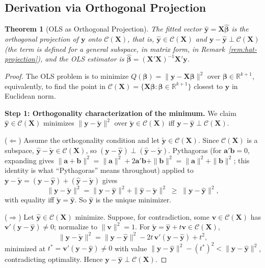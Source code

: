 \documentclass[14pt]{extarticle}
\theoremstyle{plain}
\newtheorem{theorem}{Theorem}[section]
\theoremstyle{definition}
\theoremstyle{remark}
\newcommand{\bX}{\mathbf{X}}
\newcommand{\by}{\mathbf{y}}
\def\bb{\boldsymbol{\beta}}
\newcommand{\bv}{\mathbf{v}}
\newcommand{\Real}{\mathbb{R}}
\newcommand{\calC}{\mathcal{C}}
\begin{document}
\subsection{Derivation via Orthogonal Projection}

\begin{theorem}[OLS as Orthogonal Projection]\label{thm:ols-proj}
The fitted vector $\hat{\by} = \bX\hat{\bb}$ is the orthogonal projection of $\by$ onto $\calC(\bX)$, that is, $\hat{\by} \in \calC(\bX)$ and $\by - \hat{\by} \perp \calC(\bX)$ (the term is defined for a general subspace, in matrix form, in Remark~\ref{rem:hat-projection}), and the OLS estimator is $\hat{\bb} = (\bX'\bX)^{-1}\bX'\by$.
\end{theorem}

\begin{proof}
The OLS problem is to minimize $Q(\bb) = \|\by - \bX\bb\|^2$ over $\bb \in \Real^{k+1}$, equivalently, to find the point in $\calC(\bX) = \{\bX\bb : \bb \in \Real^{k+1}\}$ closest to $\by$ in Euclidean norm.

\textbf{Step 1: Orthogonality characterization of the minimum.} We claim $\hat{\by} \in \calC(\bX)$ minimizes $\|\by - \tilde{\by}\|^2$ over $\tilde{\by} \in \calC(\bX)$ iff $\by - \hat{\by} \perp \calC(\bX)$.

($\Leftarrow$) Assume the orthogonality condition and let $\tilde{\by} \in \calC(\bX)$. Since $\calC(\bX)$ is a subspace, $\hat{\by} - \tilde{\by} \in \calC(\bX)$, so $(\by - \hat{\by}) \perp (\hat{\by} - \tilde{\by})$. Pythagoras (for $\mathbf{a}'\mathbf{b} = 0$, expanding gives $\|\mathbf{a} + \mathbf{b}\|^2 = \|\mathbf{a}\|^2 + 2\mathbf{a}'\mathbf{b} + \|\mathbf{b}\|^2 = \|\mathbf{a}\|^2 + \|\mathbf{b}\|^2$; this identity is what ``Pythagoras'' means throughout) applied to $\by - \tilde{\by} = (\by - \hat{\by}) + (\hat{\by} - \tilde{\by})$ gives
\[
\|\by - \tilde{\by}\|^2 = \|\by - \hat{\by}\|^2 + \|\hat{\by} - \tilde{\by}\|^2 \;\geqslant\; \|\by - \hat{\by}\|^2,
\]
with equality iff $\tilde{\by} = \hat{\by}$. So $\hat{\by}$ is the unique minimizer.

($\Rightarrow$) Let $\hat{\by} \in \calC(\bX)$ minimize. Suppose, for contradiction, some $\bv \in \calC(\bX)$ has $\bv'(\by - \hat{\by}) \neq 0$; normalize to $\|\bv\|^2 = 1$. For $\tilde{\by} = \hat{\by} + t\bv \in \calC(\bX)$,
\[
\|\by - \tilde{\by}\|^2 = \|\by - \hat{\by}\|^2 - 2t\,\bv'(\by - \hat{\by}) + t^2,
\]
minimized at $t^* = \bv'(\by - \hat{\by}) \neq 0$ with value $\|\by - \hat{\by}\|^2 - (t^*)^2 < \|\by - \hat{\by}\|^2$, contradicting optimality. Hence $\by - \hat{\by} \perp \calC(\bX)$.


\end{proof}
\end{document}
